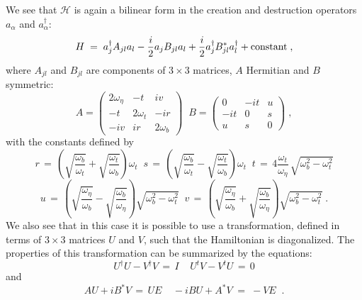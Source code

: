 \documentclass[a4paper,12pt]{article}
\begin{document}
We see that ${\mathcal H}$ is again a bilinear form in the creation and 
destruction operators $a_{\alpha}$ and $a_{\alpha}^\dagger$:
\begin{equation}\label{bilinear1}
H\;=\;a_j^\dagger A_{jl} a_l - \frac{i}{2} a_j B_{jl} a_l + \frac{i}{2} a_j^\dagger B^*_{jl} a_l^\dagger + {\rm constant}\;,
\end{equation}
where $A_{jl}$ and $B_{jl}$ are components of $3\times3$ matrices, $A$ Hermitian and $B$ 
symmetric:
\begin{equation}\label{matrices1}
A= \left(\begin{array}{ccc}
  2 \omega_\eta & -t & i v \\
  -t  & 2 \omega_t & -i r\\
   -i v& i r & 2 \omega_b  
\end{array} \right) \;\; 
B= \left(\begin{array}{ccc}
  0 & -i t & u \\
  -i t & 0 & s \\
     u & s & 0
\end{array} \right)\; ,
\end{equation}
with the constants defined by
$$
r \,=\, ( \sqrt{\frac{\omega_b}{\omega_t}} + \sqrt{\frac{\omega_t}{\omega_b}}) \omega_t \;\; 
s \,=\, ( \sqrt{\frac{\omega_b}{\omega_t}} - \sqrt{\frac{\omega_t}{\omega_b}}) \omega_t \;\;
t \,=\, 4 \frac{\omega_t}{\omega_\eta} \, \sqrt{\omega^2_b - \omega^2_t}
$$
\begin{equation}
u \,=\, (\sqrt{\frac{\omega_\eta}{\omega_b}} - \sqrt{\frac{\omega_b}{\omega_\eta}}) \sqrt{\omega^2_b - \omega^2_t}\;\;
v \,=\, (\sqrt{\frac{\omega_\eta}{\omega_b}} + \sqrt{\frac{\omega_b}{\omega_\eta}}) \sqrt{\omega^2_b - \omega^2_t}\;.
\end{equation}
We also see that in this case it is possible to use a transformation,
defined in terms of $3\times3$ matrices $U$ and $V$, such that the Hamiltonian
is diagonalized. The properties of this transformation can be summarized by
the equations: 
\begin{equation}
U^\dagger U - V^\dagger V\,=\,I \;\;\;\; U^t V-V^t U\,=\,0 
\end{equation}
and 
\begin{equation}
A U + i B^* V \,=\, U E \;\;\;\; -i B U + A^* V \;=\;- V E \;\;.
\end{equation}
\end{document}
